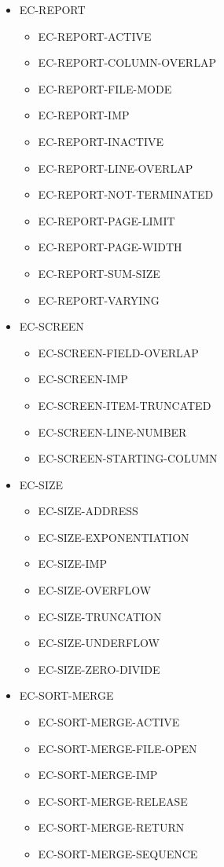 \begin{itemize}
\item EC-REPORT
  \begin{itemize}
  \item EC-REPORT-ACTIVE
  \item EC-REPORT-COLUMN-OVERLAP
  \item EC-REPORT-FILE-MODE
  \item EC-REPORT-IMP
  \item EC-REPORT-INACTIVE
  \item EC-REPORT-LINE-OVERLAP
  \item EC-REPORT-NOT-TERMINATED
  \item EC-REPORT-PAGE-LIMIT
  \item EC-REPORT-PAGE-WIDTH
  \item EC-REPORT-SUM-SIZE
  \item EC-REPORT-VARYING
  \end{itemize}

\item EC-SCREEN
  \begin{itemize}
  \item EC-SCREEN-FIELD-OVERLAP
  \item EC-SCREEN-IMP
  \item EC-SCREEN-ITEM-TRUNCATED
  \item EC-SCREEN-LINE-NUMBER
  \item EC-SCREEN-STARTING-COLUMN
  \end{itemize}

\item EC-SIZE
  \begin{itemize}
  \item EC-SIZE-ADDRESS
  \item EC-SIZE-EXPONENTIATION
  \item EC-SIZE-IMP
  \item EC-SIZE-OVERFLOW
  \item EC-SIZE-TRUNCATION
  \item EC-SIZE-UNDERFLOW
  \item EC-SIZE-ZERO-DIVIDE
  \end{itemize}

\item EC-SORT-MERGE
  \begin{itemize}
  \item EC-SORT-MERGE-ACTIVE
  \item EC-SORT-MERGE-FILE-OPEN
  \item EC-SORT-MERGE-IMP
  \item EC-SORT-MERGE-RELEASE
  \item EC-SORT-MERGE-RETURN
  \item EC-SORT-MERGE-SEQUENCE
  \end{itemize}


\end{itemize}

